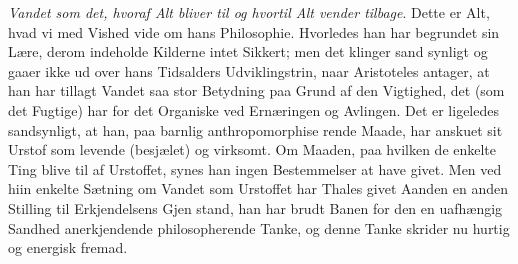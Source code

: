 \documentclass[12pt,a4paper]{book}
\begin{document}
\emph{Vandet som det, hvoraf Alt bliver til og hvortil Alt
vender tilbage}. Dette er Alt, hvad vi med Vished vide
om hans Philosophie. Hvorledes han har begrundet sin Lære,
derom indeholde Kilderne intet Sikkert; men det klinger sand\-%
synligt og gaaer ikke ud over hans Tidsalders Udviklingstrin,
naar Aristoteles antager, at han har tillagt Vandet saa stor
Betydning paa Grund af den Vigtighed, det (som det Fugtige)
har for det Organiske ved Ernæringen og Avlingen. Det er
ligeledes sandsynligt, at han, paa barnlig anthropomorphise\-%
rende Maade, har anskuet sit Urstof som levende (besjælet) og
virksomt. Om Maaden, paa hvilken de enkelte Ting blive til
af Urstoffet, synes han ingen Bestemmelser at have givet.
Men ved hiin enkelte Sætning om Vandet som Urstoffet har
Thales givet Aanden en anden Stilling til Erkjendelsens Gjen\-%
stand, han har brudt Banen for den en uafhængig Sandhed
anerkjendende philosopherende Tanke, og denne Tanke skrider
nu hurtig og energisk fremad.
\end{document}
